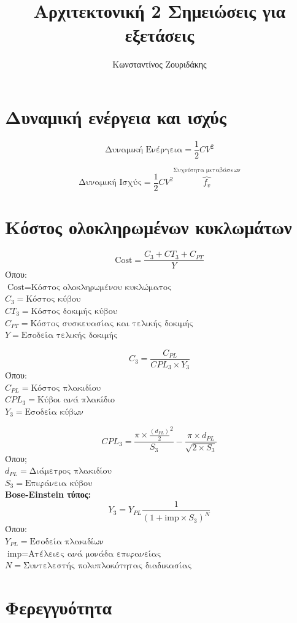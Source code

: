\documentclass[11pt, oneside]{article}   	%
\title{Αρχιτεκτονική 2 Σημειώσεις για εξετάσεις}
\author{Κωνσταντίνος Ζουριδάκης}
\date{}							%
\begin{document}
\maketitle

\section{Δυναμική ενέργεια και ισχύς}
\[\text{Δυναμική Ενέργεια} = \frac{1}{2} C V^2 \]
 
 \[\text{Δυναμική Ισχύς} = \frac{1}{2} C V^2 \overbrace{f_v}^\text{Συχνότητα μεταβάσεων}\]
 
\section{Κόστος ολοκληρωμένων κυκλωμάτων}

 \[ \text{Cost}= \frac{C_3+CT_3+C_{PT}}{Y}\]  
 Όπου: \\
 $\text{Cost} = \text{Κόστος ολοκληρωμένου κυκλώματος}$ \\
 $C_3 = \text{Κόστος κύβου}$ \\
 $CT_3 = \text{Κόστος δοκιμής κύβου}$ \\
 $C_{PT} = \text{Κόστος συσκευασίας και τελικής δοκιμής}$ \\
 $Y = \text{Εσοδεία τελικής δοκιμής}$
 
 \[C_3 = \frac{C_{PL}}{CPL_3 \times Y_3}\]
 Όπου:\\
 $C_{PL} = \text{Κόστος πλακιδίου}$ \\
 $CPL_3 = \text{Κύβοι ανά πλακίδιο}$ \\
 $Y_3 = \text{Εσοδεία κύβων}$
 
 \[CPL_3 = \frac{\pi \times \frac{(d_{PL})}{2}^2}{S_3} - \frac{\pi \times d_{PL}}{\sqrt{2 \times S_3}}\]
 Όπου; \\
 $d_{PL} = \text{Διάμετρος πλακιδίου}$ \\
 $S_3 = \text{Επιφάνεια κύβου}$ \\

\textbf{Bose-Einstein τύπος:}
\[Y_3 = Y_{PL} \frac{1}{(1 + \text{imp} \times S_3)^N}\]
Όπου:\\
$Y_{PL} = \text{Εσοδεία πλακιδίων}$ \\
$\text{imp} = \text{Ατέλειες ανά μονάδα επιφανείας}$\\
$N = \text{Συντελεστής πολυπλοκότητας διαδικασίας}$

\section{Φερεγγυότητα}
\end{document}
